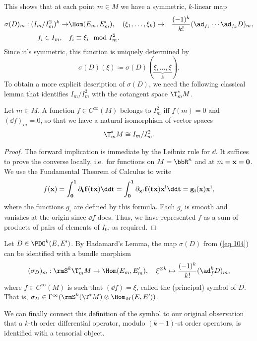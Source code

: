 This shows that at each point $m\in M$ we have a symmetric, $k$-linear map 
\begin{align}
    \sigma(D)_m:(I_m\slash I_m^2)^k\to& \Hom(E_m,E_m'),\quad 
    (\xi_1,\ldots,\xi_k)\mapsto& \frac{(-1)^k}{k!}(\ad_{f_1}\cdots \ad_{f_k}D)_m,\label{eq 104}\\
    f_i\in I_m,\quad &f_i\equiv \xi_i\mod I^2_m.
\end{align}
Since it's symmetric, this function is uniquely determined by 
\[\sigma(D)(\xi)\coloneqq \sigma(D)(\underbrace{\xi,\ldots,\xi}_k).\]
To obtain a more explicit description of $\sigma(D)$, we need the following classical lemma that identifies $I_m\slash I^2_m$ with the cotangent space $\T^\ast_m M$.

\begin{lem}
    Let $m\in M$. A function $f\in C^\infty(M)$ belongs to $I^2_m$ iff $f(m)=0$ and $(\dd f)_m=0$, so that we have a natural isomorphism of vector spaces 
    \[\T^\ast_m M\cong I_m\slash I^2_m.\]
\end{lem}
\begin{proof}
    The forward implication is immediate by the Leibniz rule for $\dd$. It suffices to prove the converse locally, i.e.\ for functions on $M=\bbR^n$ and at $m=\bf{x}=0$. We use the Fundamental Theorem of Calculus to write 
    \[f(\bf{x})=\int_0^1 \partial_t f(t\bf{x})\dd t=\int_0^1 \partial_{x^i}f(t\bf{x})x^i\dd t=g_i(\bf{x})x^i,\]
    where the functions $g_i$ are defined by this formula. Each $g_i$ is smooth and vanishes at the origin since $\dd f$ does. Thus, we have represented $f$ as a sum of products of pairs of elements of $I_0$, as required. 
\end{proof}

\begin{defn}[Symbol]
    Let $D\in\PDO^k(E,E')$. By Hadamard's Lemma, the map $\sigma(D)$ from (\ref{eq 104}) can be identified with a bundle morphism
    \[(\sigma_D)_m:\rmS^k \T^\ast_mM\to \Hom(E_m,E_m'),\quad \xi^{\otimes k}\mapsto \frac{(-1)^k}{k!}(\ad_f^k D)_m, \]
    where $f\in C^\infty(M)$ is such that $(\dd f)=\xi$, called the (principal) symbol of $D$. That is, $\sigma_D\in \Gamma^\infty(\rmS^k(\T^\ast M)\otimes \Hom_M(E,E'))$.
\end{defn}

We can finally connect this definition of the symbol to our original observation that a $k$-th order differential operator, modulo $(k-1)$-st order operators, is identified with a tensorial object.

